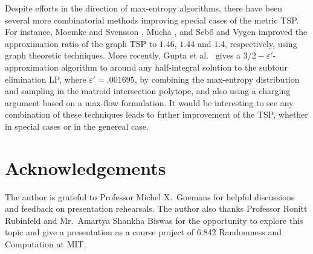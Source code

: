 \documentclass[letterpaper, reqno,12pt]{article}
\begin{document}
Despite efforts in the direction of max-entropy algorithms, there have been several more combinatorial methods improving special cases of the metric TSP. For instance, Moemke and Svensson \cite{momke2011approximating}, Mucha \cite{mucha2014frac}, and Seb\H{o} and Vygen \cite{ sebHo2014shorter} improved the approximation ratio of the graph TSP to $1.46$, $1.44$ and $1.4$, respectively, using graph theoretic techniques. More recently, Gupta et al.\ \cite{gupta2021matroid} gives a $3/2 - \varepsilon'$-approximation algorithm to around any half-integral solution to the subtour elimination LP, where $\varepsilon' = .001695$, by combining the max-entropy distribution and sampling in the matroid intersection polytope, and also using a charging argument based on a max-flow formulation. It would be interesting to see any combination of these techniques leads to futher improvement of the TSP, whether in special cases or in the genereal case.

\section*{Acknowledgements}

The author is grateful to Professor Michel X.\ Goemans for helpful discussions and feedback on presentation rehearsals. The author also thanks Professor Ronitt Rubinfeld and Mr.\ Amartya Shankha Biswas for the opportunity to explore this topic and give a presentation as a course project of 6.842 Randomness and Computation at MIT.



\end{document}
